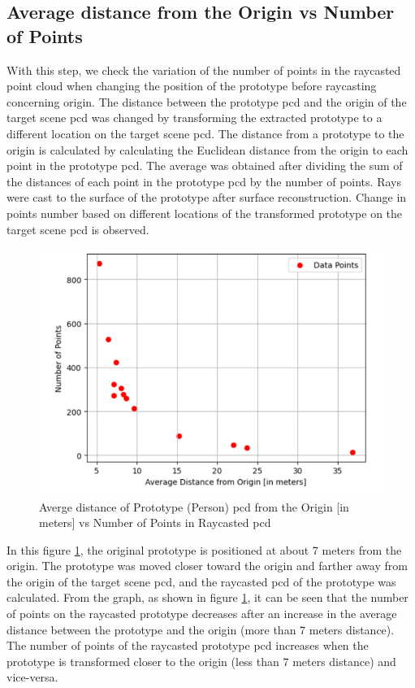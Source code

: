 \subsection{Average distance from the Origin vs Number of Points}
With this step, we check the variation of the number of points in the raycasted point cloud when changing the position of the prototype before raycasting concerning origin. The distance between the prototype \acrshort{pcd} and the origin of the target scene \acrshort{pcd} was changed by transforming the extracted prototype to a different location on the target scene \acrshort{pcd}. The distance from a prototype to the origin is calculated by calculating the Euclidean distance from the origin to each point in the prototype \acrshort{pcd}. The average was obtained after dividing the sum of the distances of each point in the prototype \acrshort{pcd} by the number of points. Rays were cast to the surface of the prototype after surface reconstruction.  Change in points number based on different locations of the transformed prototype on the target scene \acrshort{pcd} is observed.

\begin{figure}[htbp]
    \centering
    \includegraphics[width=0.8\linewidth]{97_graphics/evaluation/avg_distn_vs_points_numbers.pdf}
    \caption{Averge distance of Prototype (Person) \acrshort{pcd} from the Origin [in meters] vs Number of Points in Raycasted \acrshort{pcd}}
    \label{fig:evalution_avg_distn_vs_points_number}
\end{figure}
In this figure \ref{fig:evalution_avg_distn_vs_points_number}, the original prototype is positioned at about 7 meters from the origin. The prototype was moved closer toward the origin and farther away from the origin of the target scene \acrshort{pcd}, and the raycasted \acrshort{pcd} of the prototype was calculated. From the graph, as shown in figure \ref{fig:evalution_avg_distn_vs_points_number}, it can be seen that the number of points on the raycasted prototype decreases after an increase in the average distance between the prototype and the origin (more than 7 meters distance). The number of points of the raycasted prototype \acrshort{pcd} increases when the prototype is transformed closer to the origin (less than 7 meters distance) and vice-versa.

